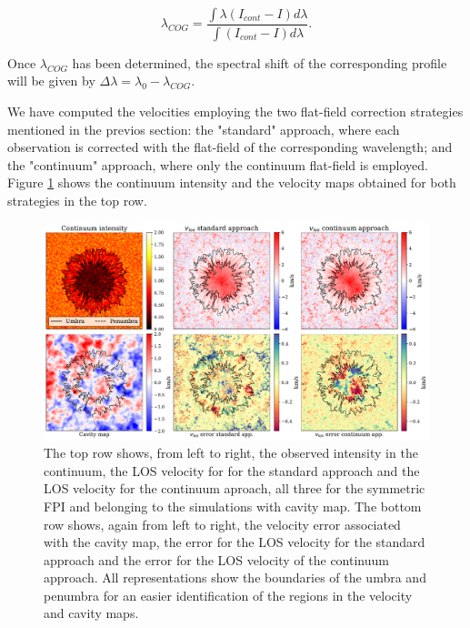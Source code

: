\begin{equation}
  \lambda _ {COG} = \frac{\int \lambda \left( I _{cont} - I\right)d\lambda}{\int \left( I _{cont} - I\right)d\lambda}. 
\end{equation}

Once $\lambda _ {COG}$ has been determined, the spectral shift of the corresponding profile will be given by $\Delta \lambda = \lambda _ 0 - \lambda _ {COG}$. 

We have computed the velocities employing the two flat-field correction strategies mentioned in the previos section: the "standard" approach, where each observation is corrected with the flat-field of the corresponding wavelength; and the "continuum" approach, where only the continuum flat-field is employed. Figure \ref{fig_mancha: int_and_vlos_examples} shows the continuum intensity and the velocity maps obtained for both strategies in the top row.  

\begin{figure}
  \includegraphics[width=\textwidth]{figures/Mancha/intensity_and_vlos_examples.pdf}
  \caption{
    The top row shows, from left to right, the observed intensity in the continuum, the LOS velocity for for the standard approach and the LOS velocity for the continuum aproach, all three for the symmetric FPI and belonging to the simulations with cavity map. The bottom row shows, again from left to right, the velocity error associated with the cavity map, the error for the LOS velocity for the standard approach and the error for the LOS velocity of the continuum approach. All representations show the boundaries of the umbra and penumbra for an easier identification of the regions in the velocity and cavity maps.   
    \label{fig_mancha: int_and_vlos_examples}}
\end{figure}

